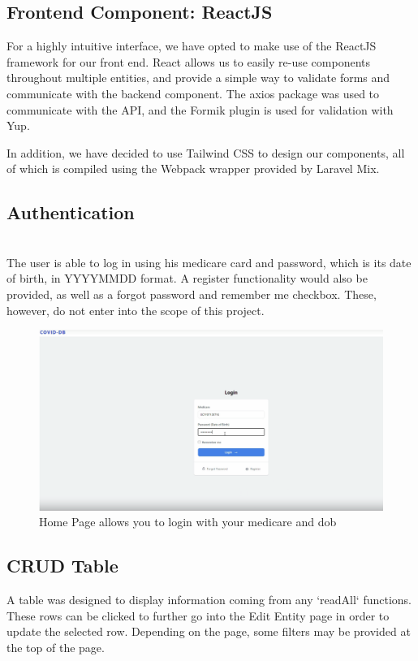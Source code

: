 \documentclass{article}
\begin{document}
\subsection{Frontend Component: ReactJS}

For a highly intuitive interface, we have opted to make use of the ReactJS framework for our front end. React allows us to easily re-use components throughout multiple entities, and provide a simple way to validate forms and communicate with the backend component. The axios package was used to communicate with the API, and the Formik plugin is used for validation with Yup. 

In addition, we have decided to use Tailwind CSS to design our components, all of which is compiled using the Webpack wrapper provided by Laravel Mix.


\subsection{Authentication}
\\
The user is able to log in using his medicare card and password, which is its date of birth, in YYYYMMDD format. A register functionality would also be provided, as well as a forgot password and remember me checkbox. These, however, do not enter into the scope of this project.

\begin{figure}[H]
    \centering
    \includegraphics[scale=0.35]{imgs/loginScreen.PNG}
    \caption{Home Page allows you to login with your medicare and dob}
\end{figure}

\subsection{CRUD Table}

A table was designed to display information coming from any `readAll` functions. These rows can be clicked to further go into the Edit Entity page in order to update the selected row. Depending on the page, some filters may be provided at the top of the page.
\end{document}

